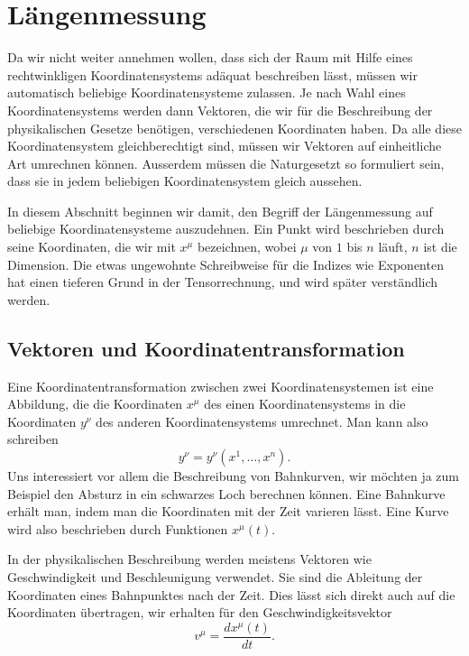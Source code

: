 %
%
%
\section{Längenmessung
\label{skript:kruemmung:section:laengenmessung}}
Da wir nicht weiter annehmen wollen, dass sich der Raum mit Hilfe
eines rechtwinkligen Koordinatensystems adäquat beschreiben lässt,
müssen wir automatisch beliebige Koordinatensysteme zulassen.
Je nach Wahl eines Koordinatensystems werden dann Vektoren, die
wir für die Beschreibung der physikalischen Gesetze benötigen,
verschiedenen Koordinaten haben.
Da alle diese Koordinatensystem gleichberechtigt sind, müssen
wir Vektoren auf einheitliche Art umrechnen können.
Ausserdem müssen die Naturgesetzt so formuliert sein, dass
sie in jedem beliebigen Koordinatensystem gleich aussehen.

In diesem Abschnitt beginnen wir damit, den Begriff der Längenmessung
auf beliebige Koordinatensysteme auszudehnen.
Ein Punkt wird beschrieben durch seine Koordinaten, die wir mit
$x^\mu$ bezeichnen, wobei $\mu$ von $1$ bis $n$ läuft, $n$
ist die Dimension. 
Die etwas ungewohnte Schreibweise für die Indizes wie Exponenten
hat einen tieferen Grund in der Tensorrechnung, und wird später
verständlich werden.

\subsection{Vektoren und Koordinatentransformation}
Eine Koordinatentransformation zwischen zwei Koordinatensystemen ist
eine Abbildung, die die Koordinaten $x^\mu$ des einen Koordinatensystems
in die Koordinaten $y^\nu$ des anderen Koordinatensystems umrechnet.
Man kann also schreiben
\begin{equation}
y^{\nu}=y^{\nu}(x^1,\dots,x^n).
\label{skript:kruemmung:umrechnung}
\end{equation}
Uns interessiert vor allem die Beschreibung von Bahnkurven, wir möchten
ja zum Beispiel den Absturz in ein schwarzes Loch berechnen können.
Eine Bahnkurve erhält man, indem man die Koordinaten mit der Zeit
varieren lässt.
Eine Kurve wird also beschrieben durch Funktionen $x^\mu(t)$.

In der physikalischen Beschreibung werden meistens Vektoren wie
Geschwindigkeit und Beschleunigung verwendet.
Sie sind die Ableitung der Koordinaten eines Bahnpunktes nach
der Zeit.
Dies lässt sich direkt auch auf die Koordinaten übertragen,
wir erhalten für den Geschwindigkeitsvektor
\[
v^{\mu} = \frac{dx^\mu(t)}{dt}.
\]

